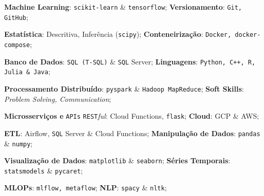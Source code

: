 \documentclass[letterpaper,11pt]{article}
\newcommand{\resumeSubHeadingListStart}{\begin{itemize}[leftmargin=*]}
\newcommand{\resumeSubHeadingListEnd}{\end{itemize}}
\begin{document}
 \resumeSubHeadingListStart
    \color{gray}
    \small{
        \item {\textbf{Machine Learning}: \texttt{scikit-learn} \& \texttt{tensorflow};}
            \hspace{65pt} \textbf{Versionamento}: \texttt{Git, GitHub};
        \item {\textbf{Estatística}: Descritiva, Inferência (\texttt{scipy});}
            \hspace{104pt} \textbf{Conteneirização}: \texttt{Docker, docker-compose};
        \item{
         {{\textbf{Banco de Dados}: \texttt{SQL (T-SQL)} \& \texttt{SQL} Server;}
            \hspace{90pt}\textbf{Linguagens}: \texttt{Python, C++, R, Julia \& Java};}
        }
        \item{
        {{\textbf{Processamento Distribuído}: \texttt{pyspark} \& \texttt{Hadoop MapReduce};
            \hspace{15pt} \textbf{Soft Skills}: \textit{Problem Solving, Communication};}}
        \item{\textbf{Microsserviços e} \texttt{APIs} \texttt{REST}\textit{ful}: {Cloud Functions, \texttt{flask}};
            \hspace{38pt} \textbf{Cloud}: GCP \& AWS};
        }
        \item{ \textbf{ETL}: Airflow, \texttt{SQL} Server \& Cloud Functions;
            \hspace{93pt} \textbf{Manipulação de Dados}: \texttt{pandas} \& \texttt{numpy};}
        \item{\textbf{Visualização de Dados}: \texttt{matplotlib} \& \texttt{seaborn};
            \hspace{70pt} \textbf{Séries Temporais}: \texttt{statsmodels} \& \texttt{pycaret};}
        \item{\textbf{MLOPs}: \texttt{mlflow, metaflow};
            \hspace{163pt} \textbf{NLP}: \texttt{spacy} \& \texttt{nltk};}
    }
 \resumeSubHeadingListEnd
 
\end{document}
